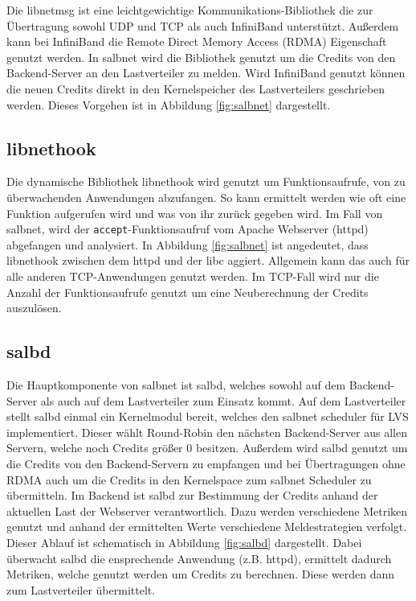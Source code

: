 \documentclass[a4paper, 12pt, BCOR10mm, DIV12, toc=bibliography, toc=listof, german]{scrbook}
\begin{document}
			Die libnetmsg \cite{rabweg2009} ist eine leichtgewichtige Kommunikations-Bibliothek die zur
			Übertragung sowohl UDP und TCP als auch InfiniBand unterstützt. Außerdem kann bei InfiniBand
			die Remote Direct Memory Access (RDMA) Eigenschaft genutzt werden. In salbnet wird die
			Bibliothek genutzt um die Credits von den Backend-Server an den Lastverteiler zu melden. Wird
			InfiniBand genutzt können die neuen Credits direkt in den Kernelspeicher des Lastverteilers
			geschrieben werden. Dieses Vorgehen ist in Abbildung \ref{fig:salbnet} dargestellt.

		
		\subsection*{libnethook} %

			Die dynamische Bibliothek libnethook wird genutzt um Funktionsaufrufe, von zu überwachenden
			Anwendungen abzufangen. So kann ermittelt werden wie oft eine Funktion aufgerufen wird und was
			von ihr zurück gegeben wird. Im Fall von salbnet, wird der \texttt{accept}-Funktionsaufruf vom
			Apache Webserver (httpd) \cite{httpd} abgefangen und analysiert. In
			Abbildung \ref{fig:salbnet} ist angedeutet, dass libnethook zwischen dem httpd und der libc
			aggiert. Allgemein kann das auch für alle anderen TCP-Anwendungen genutzt werden. Im TCP-Fall
			wird nur die Anzahl der Funktionsaufrufe genutzt um eine Neuberechnung der Credits auszulösen.



		\subsection*{salbd} %

			Die Hauptkomponente von salbnet ist salbd, welches sowohl auf dem Backend-Server als auch auf
			dem Lastverteiler zum Einsatz kommt. Auf dem Lastverteiler stellt salbd einmal ein Kernelmodul
			bereit, welches den salbnet scheduler für LVS implementiert. Dieser wählt Round-Robin den
			nächsten Backend-Server aus allen Servern, welche noch Credits größer 0 besitzen. Außerdem
			wird salbd genutzt um die Credits von den Backend-Servern zu empfangen und bei Übertragungen
			ohne RDMA auch um die Credits in den Kernelspace zum salbnet Scheduler zu übermitteln.  Im
			Backend ist salbd zur Bestimmung der Credits anhand der aktuellen Last der Webserver
			verantwortlich. Dazu werden verschiedene Metriken genutzt und anhand der ermittelten Werte
			verschiedene Meldestrategien verfolgt. Dieser Ablauf ist schematisch in Abbildung
			\ref{fig:salbd} dargestellt. Dabei überwacht salbd die ensprechende Anwendung (z.B.
			httpd), ermittelt dadurch Metriken, welche genutzt werden um Credits zu berechnen. Diese
			werden dann zum Lastverteiler übermittelt.
\end{document}
